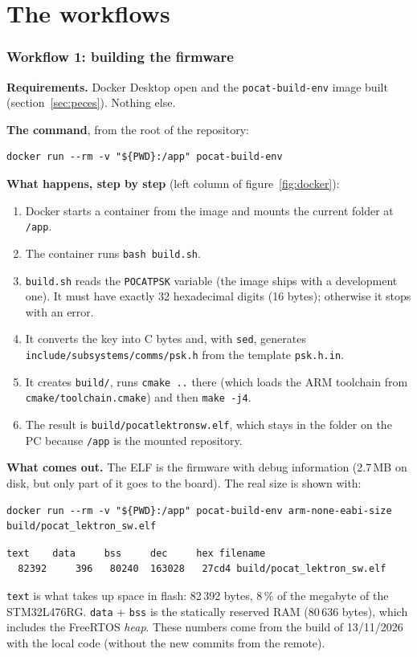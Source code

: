 \documentclass[11pt,a4paper]{article}
\DeclareRobustCommand{\_}{\textunderscore\allowbreak}
\newcommand{\cd}[1]{\texttt{#1}}
\begin{document}
\part{The workflows}

\section{Workflow 1: building the firmware}\label{sec:build}

\textbf{Requirements.} Docker Desktop open and the \cd{pocat-build-env} image built
(section~\ref{sec:peces}). Nothing else.

\textbf{The command}, from the root of the repository:
\begin{lstlisting}
docker run --rm -v "${PWD}:/app" pocat-build-env
\end{lstlisting}

\textbf{What happens, step by step} (left column of figure~\ref{fig:docker}):
\begin{enumerate}
\item Docker starts a container from the image and mounts the current folder at \cd{/app}.
\item The container runs \cd{bash build.sh}.
\item \cd{build.sh} reads the \cd{POCAT\_PSK} variable (the image ships with a development
  one). It must have exactly 32 hexadecimal digits (16 bytes); otherwise it stops
  with an error.
\item It converts the key into C bytes and, with \cd{sed}, generates
  \cd{include/subsystems/comms/psk.h} from the template \cd{psk.h.in}.
\item It creates \cd{build/}, runs \cd{cmake ..} there (which loads the ARM toolchain from
  \cd{cmake/toolchain.cmake}) and then \cd{make -j4}.
\item The result is \cd{build/pocat\_lektron\_sw.elf}, which stays in the folder on the PC because
  \cd{/app} is the mounted repository.
\end{enumerate}

\textbf{What comes out.} The ELF is the firmware with debug information (2.7\,MB on disk,
but only part of it goes to the board). The real size is shown with:
\begin{lstlisting}
docker run --rm -v "${PWD}:/app" pocat-build-env arm-none-eabi-size build/pocat_lektron_sw.elf
\end{lstlisting}
\begin{lstlisting}[style=out]
   text    data     bss     dec     hex filename
  82392     396   80240  163028   27cd4 build/pocat_lektron_sw.elf
\end{lstlisting}
\cd{text} is what takes up space in flash: 82\,392 bytes, 8\,\% of the megabyte of the STM32L476RG.
\cd{data} + \cd{bss} is the statically reserved RAM (80\,636 bytes), which includes the
FreeRTOS \emph{heap}. These numbers come from the build of 13/11/2026 with the local code
(without the new commits from the remote).
\end{document}
